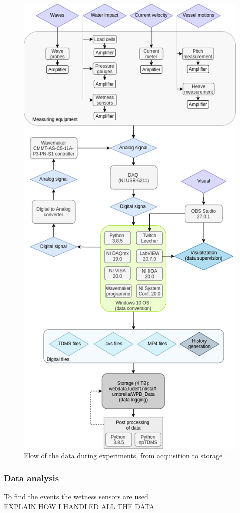 \begin{figure}
	\centering
	\includegraphics[width=0.8\linewidth]{figs/Data_acquisition_flow.drawio.png}
	\caption{Flow of the data during experiments, from acquisition to storage}
	\label{fig:exp_data_flow}
\end{figure}




\subsubsection{Data analysis}
\label{sec:analyzing_data}
To find the events the wetness sensors are used \\
EXPLAIN HOW I HANDLED ALL THE DATA


